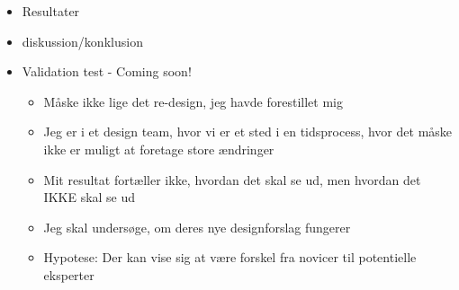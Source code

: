 \begin{itemize}
	
	\item Resultater
	\item diskussion/konklusion
	\item Validation test - Coming soon!
	\begin{itemize}
		\item Måske ikke lige det re-design, jeg havde forestillet mig
		\item Jeg er i et design team, hvor vi er et sted i en tidsprocess, hvor det måske ikke er muligt at foretage store ændringer
		\item Mit resultat fortæller ikke, hvordan det skal se ud, men hvordan det IKKE skal se ud
		\item Jeg skal undersøge, om deres nye designforslag fungerer
		\item Hypotese: Der kan vise sig at være forskel fra novicer til potentielle eksperter
	\end{itemize}
\end{itemize}

















